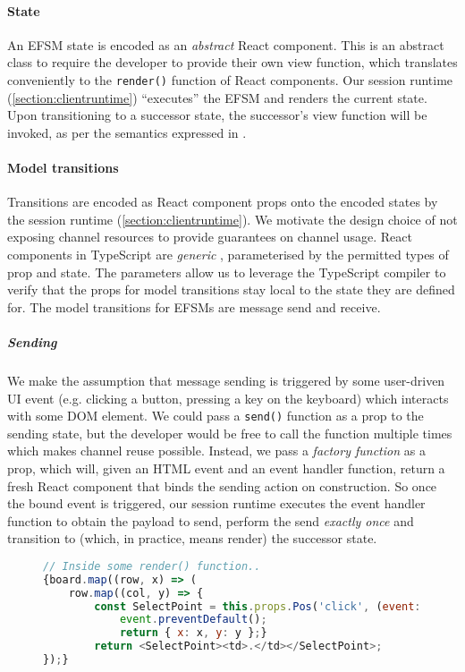\paragraph{State}
An EFSM state is encoded as an \textit{abstract} React
component.
This is an abstract class to require the developer to provide their
own view function, which translates conveniently to the \texttt{render()}
function of React components.
Our session runtime (\cref{section:clientruntime}) ``executes'' the EFSM and
renders the current state.
Upon transitioning to a successor state, the successor's view function will be
invoked, as per the semantics expressed in \cite{MVU2019}.

\paragraph{Model transitions}
Transitions are encoded as React component props onto the encoded states by the
session runtime (\cref{section:clientruntime}).
We motivate the design choice of not exposing channel resources to provide
guarantees on channel usage.
React components in TypeScript are
\textit{generic} \cite{TypeScriptSpec}, parameterised by the permitted
types of prop and state.
The parameters allow us to leverage the TypeScript compiler to
verify that the props for model transitions stay local to the state they are
defined for.
The model transitions for EFSMs are message send and receive.

\subparagraph{Sending}
We make the assumption that message sending is triggered by
some user-driven UI event (e.g. clicking a button, pressing a key on the
keyboard) which interacts with some DOM element.
We could pass a
\texttt{send()} function as a prop to the sending state, but the developer
would be free to call the function multiple times which makes channel reuse
possible.
Instead, we pass a \textit{factory function} as a prop, which will,
given an HTML event and an event handler function, return a fresh React
component that binds the sending action on construction.
So once the bound event is triggered, our session runtime executes the event
handler function to obtain the payload to send, perform the send
\textit{exactly once} and transition to (which, in practice, means render) the
successor state.

\begin{figure}[!h]
\begin{lstlisting}[language=JavaScript, tabsize=4]
// Inside some render() function..
{board.map((row, x) => (
	row.map((col, y) => {
		const SelectPoint = this.props.Pos('click', (event: UIEvent) => {
			event.preventDefault();
			return { x: x, y: y };}
		return <SelectPoint><td>.</td></SelectPoint>;
});}
\end{lstlisting}
\label{lst:clientapp}
\end{figure}

